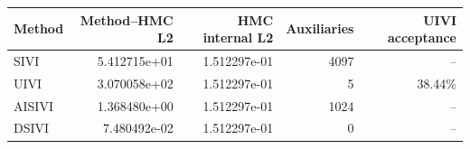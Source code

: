 \begin{tabular}{lrrrr}
\toprule
Method & Method--HMC L2 & HMC internal L2 & Auxiliaries & UIVI acceptance \\
\midrule
SIVI & 5.412715e+01 & 1.512297e-01 & 4097 & -- \\
UIVI & 3.070058e+02 & 1.512297e-01 & 5 & 38.44\% \\
AISIVI & 1.368480e+00 & 1.512297e-01 & 1024 & -- \\
DSIVI & 7.480492e-02 & 1.512297e-01 & 0 & -- \\
\bottomrule
\end{tabular}
